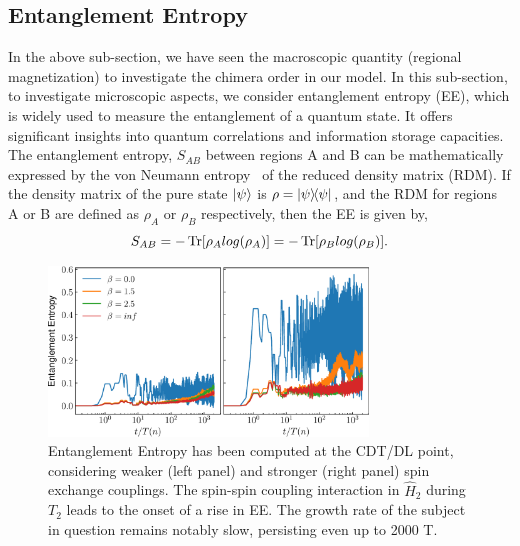 \documentclass[%
reprint,
superscriptaddress,
amsmath,amssymb,showkeys,
aps,
prb,
]{revtex4-2}
\begin{document}
	\subsection{\label{sec:level41} Entanglement Entropy}
	In the above sub-section, we have seen the macroscopic quantity (regional magnetization) to investigate the chimera order in our model. In this sub-section, to investigate microscopic aspects, we consider entanglement entropy (EE), which is widely used to measure the entanglement of a quantum state. It offers significant insights into quantum correlations and information storage capacities. The entanglement entropy, $S_{AB}$ between regions A and B can be mathematically expressed by the von Neumann entropy~\cite{bayat_entanglement_2022,mendes-santos_measuring_2020} of the reduced density matrix (RDM).   If the density matrix of the pure state $\ket{\psi}$ is $\rho = \ketbra{\psi}$, and the RDM for regions A or B are defined as $\rho_A$ or $\rho_B$ respectively, then the EE is given by,
	\begin{equation} 
		S_{AB} = -\Tr[\rho_A log(\rho_A)] = -\Tr[\rho_B log(\rho_B)].
		\label{eq:vonentrop}
	\end{equation}	
	\begin{figure}
		\begin{center}
			\includegraphics[width=8.5cm]{entangEntrp.pdf}
		\end{center}
		\caption{Entanglement Entropy has been computed at the CDT/DL point, considering weaker (left panel) and stronger (right panel) spin exchange couplings. The spin-spin coupling interaction in $\hat{H}_2$ during $T_2$ leads to the onset of a rise in EE. The growth rate of the subject in question remains notably slow, persisting even up to 2000 T.}
		\label{Fig:entangle}
	\end{figure}
	
\end{document}
